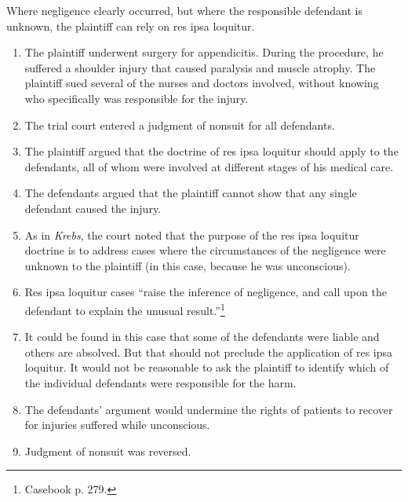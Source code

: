 Where negligence clearly occurred, but where the responsible defendant is 
unknown, the plaintiff can rely on res ipsa loquitur.

\begin{enumerate}
    \item The plaintiff underwent surgery for appendicitis. During the 
    procedure, he suffered a shoulder injury that caused paralysis and muscle 
    atrophy. The plaintiff sued several of the nurses and doctors involved, 
    without knowing who specifically was responsible for the injury.
    \item The trial court entered a judgment of nonsuit for all defendants.
    \item The plaintiff argued that the doctrine of res ipsa loquitur should 
    apply to the defendants, all of whom were involved at different stages of 
    his medical care.
    \item The defendants argued that the plaintiff cannot show that any single 
    defendant caused the injury.
    \item As in \emph{Krebs}, the court noted that the purpose of the res ipsa 
    loquitur doctrine is to address cases where the circumstances of the 
    negligence were unknown to the plaintiff (in this case, because he was 
    unconscious).
    \item Res ipsa loquitur cases ``raise the inference of negligence, and call 
    upon the defendant to explain the unusual result.''\footnote{Casebook p. 
    279.}
    \item It could be found in this case that some of the defendants were 
    liable and others are absolved. But that should not preclude the 
    application of res ipsa loquitur. It would not be reasonable to ask the 
    plaintiff to identify which of the individual defendants were responsible 
    for the harm.
    \item The defendants' argument would undermine the rights of patients to 
    recover for injuries suffered while unconscious.
    \item Judgment of nonsuit was reversed.
\end{enumerate}
